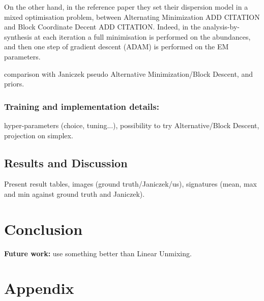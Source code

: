 \documentclass{article}
\begin{document}
On the other hand, in the reference paper they set their dispersion model in a mixed optimisation problem, between Alternating Minimization ADD CITATION and Block Coordinate Decent ADD CITATION. Indeed, in the analysis-by-synthesis at each iteration a full minimisation is performed on the abundances, and then one step of gradient descent (ADAM) is performed on the EM parameters.

comparison with Janiczek pseudo Alternative Minimization/Block Descent, and priors.

\subsubsection{Training and implementation details:} hyper-parameters (choice, tuning...), possibility to try Alternative/Block Descent, projection on simplex.

\subsection{Results and Discussion}
Present result tables, images (ground truth/Janiczek/us), signatures (mean, max and min against ground truth and Janiczek).


\section{Conclusion}
\textbf{Future work:} use something better than Linear Unmixing.




% 



\section{Appendix}
\end{document}
